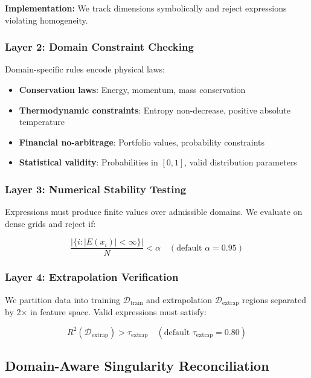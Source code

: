 \documentclass[twoside,11pt]{article}
\begin{document}
\textbf{Implementation:} We track dimensions symbolically and reject expressions violating homogeneity.

\subsubsection{Layer 2: Domain Constraint Checking}

Domain-specific rules encode physical laws:

\begin{itemize}
\item \textbf{Conservation laws}: Energy, momentum, mass conservation
\item \textbf{Thermodynamic constraints}: Entropy non-decrease, positive absolute temperature
\item \textbf{Financial no-arbitrage}: Portfolio values, probability constraints
\item \textbf{Statistical validity}: Probabilities in $[0,1]$, valid distribution parameters
\end{itemize}

\subsubsection{Layer 3: Numerical Stability Testing}

Expressions must produce finite values over admissible domains. We evaluate on dense grids and reject if:

\begin{equation}
\frac{|\{i : |E(x_i)| < \infty\}|}{N} < \alpha \quad (\text{default } \alpha = 0.95)
\end{equation}

\subsubsection{Layer 4: Extrapolation Verification}

We partition data into training $\mathcal{D}_{\text{train}}$ and extrapolation $\mathcal{D}_{\text{extrap}}$ regions separated by 2$\times$ in feature space. Valid expressions must satisfy:

\begin{equation}
R^2(\mathcal{D}_{\text{extrap}}) > \tau_{\text{extrap}} \quad (\text{default } \tau_{\text{extrap}} = 0.80)
\end{equation}

\subsection{Domain-Aware Singularity Reconciliation}
\end{document}

